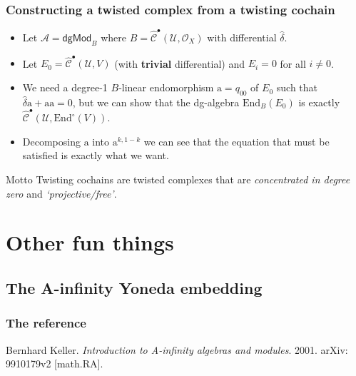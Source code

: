 \documentclass{beamer}
\begin{document}
        \begin{frame}\frametitle{Constructing a twisted complex from a twisting cochain}
            \begin{itemize}
                \item Let $\mathcal{A}=\mathsf{dgMod}_B$ where $B=\hat{\mathscr{C}}^\bullet(\mathcal{U},\mathcal{O}_X)$ with differential $\hat{\delta}$.
                \pause
                \item Let $E_0=\hat{\mathscr{C}}^\bullet(\mathcal{U},V)$ (with \textbf{trivial} differential) and $E_i=0$ for all $i\neq0$.
                \pause
                \item We need a degree-1 $B$-linear endomorphism $\mathrm{a}=q_{00}$ of $E_0$ such that $\hat{\delta}\mathrm{a}+\mathrm{a}\mathrm{a}=0$, but we can show that the dg-algebra $\mathrm{End}_B(E_0)$ is exactly $\hat{\mathscr{C}}^\bullet(\mathcal{U},\mathrm{End}^\circ(V))$.
                \item Decomposing $\mathrm{a}$ into $\mathrm{a}^{k,1-k}$ we can see that the equation that must be satisfied is exactly what we want.
            \end{itemize}

            \pause

            \begin{block}{Motto}
                Twisting cochains are twisted complexes that are \emph{concentrated in degree zero} and \emph{`projective/free'}.
            \end{block}
        \end{frame}


\section{Other fun things}

    \subsection{The A-infinity Yoneda embedding}

        \begin{frame}\frametitle{The reference}
            Bernhard Keller. \emph{Introduction to A-infinity algebras and modules}. 2001. arXiv: 9910179v2 [math.RA].
        \end{frame}
\end{document}
